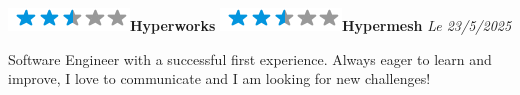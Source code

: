 \documentclass[]{friggeri-cv}
\begin{document}
\begin{aside}
\includegraphics[scale=0.40]{res/img/2-5stars.png}\hspace{1.5mm}\textbf{Hyperworks}
\includegraphics[scale=0.40]{res/img/2-5stars.png}\hspace{1.5mm}\textbf{Hypermesh}
\vspace{2.5mm}%
	\emph{Le 23/5/2025} \hspace*{8mm}
\end{aside}

\vspace{-3mm}
\begin{minipage}[t]{1.00\linewidth}
Software Engineer with a successful first experience. Always eager to learn and improve, I love to communicate and I am looking for new challenges!
\end{minipage} %
\vspace{1mm}
\end{document}

